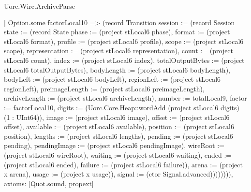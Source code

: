 \begin{lexlean}{Uorc.Wire.ArchiveParse}
\begin{semanticmodule}
{        | Option.some factorLocal10 => (record Transition {session := (record Session {state := (record State {phase := (project stLocal6 phase), format := (project stLocal6 format), profile := (project stLocal6 profile), scope := (project stLocal6 scope), representation := (project stLocal6 representation), count := (project stLocal6 count), index := (project stLocal6 index), totalOutputBytes := (project stLocal6 totalOutputBytes), bodyLength := (project stLocal6 bodyLength), bodyLeft := (project stLocal6 bodyLeft), regionLeft := (project stLocal6 regionLeft), preimageLength := (project stLocal6 preimageLength), archiveLength := (project stLocal6 archiveLength), number := totalLocal9, factor := factorLocal10, digits := (Uorc.Core.Heap::wordAdd (project stLocal6 digits) (1 : UInt64)), image := (project stLocal6 image), offset := (project stLocal6 offset), available := (project stLocal6 available), position := (project stLocal6 position), lengths := (project stLocal6 lengths), pending := (project stLocal6 pending), pendingImage := (project stLocal6 pendingImage), wireRoot := (project stLocal6 wireRoot), waiting := (project stLocal6 waiting), ended := (project stLocal6 ended), failure := (project stLocal6 failure)}), arena := (project x arena), usage := (project x usage)}), signal := (ctor Signal.advanced)}))))))),
  axioms: [Quot.sound, propext]
}


\end{semanticmodule}
\end{lexlean}
